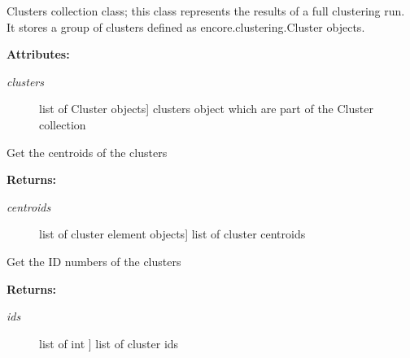 \documentclass[letterpaper,10pt,english]{sphinxmanual}
\begin{document}
\begin{fulllineitems}
\label{index:encore.clustering.Cluster.ClustersCollection}
Clusters collection class; this class represents the results of a full clustering run. It stores a group of clusters defined as encore.clustering.Cluster objects.

\textbf{Attributes:}
\begin{description}
\item[{\emph{clusters}}] \leavevmode{[}list of Cluster objects{]}
clusters object which are part of the Cluster collection

\end{description}

\begin{fulllineitems}
\label{index:encore.clustering.Cluster.ClustersCollection.get_centroids}
Get the centroids of the clusters

\textbf{Returns:}
\begin{description}
\item[{\emph{centroids}}] \leavevmode{[}list of cluster element objects{]}
list of cluster centroids

\end{description}

\end{fulllineitems}


\begin{fulllineitems}
\label{index:encore.clustering.Cluster.ClustersCollection.get_ids}
Get the ID numbers of the clusters

\textbf{Returns:}
\begin{description}
\item[{\emph{ids}}] \leavevmode{[}list of int {]}
list of cluster ids

\end{description}

\end{fulllineitems}


\end{fulllineitems}
\end{document}

